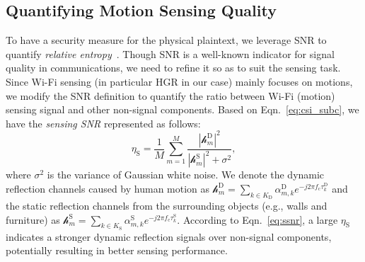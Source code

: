 \documentclass[conference,compsoc]{IEEEtran}
\newcommand{\rev}[1]{{\color{blue}#1}}      %
\newcommand{\newrev}[1]{{\color{blue}#1}}    %
\newcommand{\rev}[1]{#1}
\newcommand{\newrev}[1]{#1}
\begin{document}
\vspace{-.5ex}
\subsection{Quantifying Motion Sensing Quality} \label{ssec:psnr}
\vspace{-1ex}
%
\newrev{To have a security measure for the physical plaintext, we leverage SNR to quantify \textit{relative entropy}~\cite{SIG-018,entroy-snr}.} Though SNR is a well-known indicator for signal quality in communications, we need to refine it so as to suit the sensing task. Since Wi-Fi sensing (in particular HGR in our case) mainly focuses on motions, we modify the SNR definition to quantify the ratio between Wi-Fi (motion) sensing signal and other non-signal components. Based on Eqn.~\eqref{eq:csi_subc}, we have the \textit{sensing SNR} represented as follows:
%
\begin{equation} \label{eq:ssnr}
    \eta_{\text{S}} = \frac{1}{M} {\textstyle{\sum_{m = 1}^{M}}} \frac{| \mathcal{h}_{m}^{\mathrm{D}} |^2}{| \mathcal{h}_{m}^{\mathrm{S}}|^2 + \sigma^2},
\end{equation}
%
%
where $\sigma^2 $ is the variance of Gaussian white noise. We denote the dynamic reflection channels caused by human motion as 
\rev{$\mathcal{h}_{m}^{\mathrm{D}} = \sum_{k \in K_{\mathrm{D}}} \alpha_{m,k}^{\mathrm{D}} e^{-j 2 \pi f_{\mathrm{c}} \tau_k^{\mathrm{D}}}$}
and the static reflection channels from the surrounding objects (e.g., walls and furniture) as \rev{$\mathcal{h}_{m}^{\mathrm{S}} = \sum_{k \in K_{\mathrm{S}}} \alpha_{m,k}^{\mathrm{S}} e^{-j 2 \pi f_{\mathrm{c}} \tau_k^{\mathrm{S}} }$.}
%
According to Eqn.~\eqref{eq:ssnr}, a large $\eta_{\text{S}}$ indicates a stronger dynamic reflection signals over non-signal components, potentially resulting in better sensing performance. 
\end{document}
